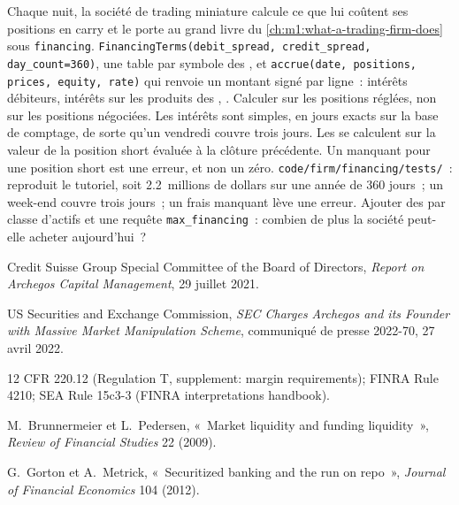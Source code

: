 \begin{build}
 Chaque nuit, la société de trading miniature calcule ce que lui coûtent
ses positions en carry et le porte au grand livre
du \cref{ch:m1:what-a-trading-firm-does} sous \texttt{financing}.  \texttt{FinancingTerms(debit\_spread, credit\_spread,
day\_count=360)}, une table par symbole des , et
\texttt{accrue(date, positions, prices, equity, rate)} qui renvoie un montant signé
par ligne~: intérêts débiteurs, intérêts sur les produits des , .
 Calculer sur les positions réglées, non sur les positions négociées. Les intérêts sont simples,
en jours exacts sur la base de comptage, de sorte qu'un vendredi couvre trois jours.
Les  se calculent sur la valeur de la position short évaluée à la clôture précédente.
Un  manquant pour une position short est une erreur, et non un zéro.
 \texttt{code/firm/financing/tests/}~: reproduit le
tutoriel, soit 2.2~millions de dollars sur une année de 360 jours~; un week-end
couvre trois jours~; un frais manquant lève une erreur.
 Ajouter des  par classe d'actifs et une requête
\texttt{max\_financing}~: combien de plus la société peut-elle acheter aujourd'hui~?
\end{build}

\begin{omsources}
\item Credit Suisse Group Special Committee of the Board of Directors,
\emph{Report on Archegos Capital Management}, 29 juillet 2021.
\item US Securities and Exchange Commission, \emph{SEC Charges Archegos and
its Founder with Massive Market Manipulation Scheme}, communiqué de presse 2022-70,
27 avril 2022.
\item 12 CFR 220.12 (Regulation T, supplement: margin requirements); FINRA
Rule 4210; SEA Rule 15c3-3 (FINRA interpretations handbook).
\item M.~Brunnermeier et L.~Pedersen, «~Market liquidity and funding
liquidity~», \emph{Review of Financial Studies} 22 (2009).
\item G.~Gorton et A.~Metrick, «~Securitized banking and the run on repo~»,
\emph{Journal of Financial Economics} 104 (2012).
\end{omsources}

